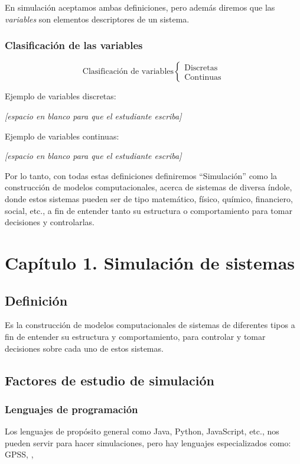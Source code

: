 \documentclass[11pt,letterpaper]{report}
\newcommand{\espacio}{\par\noindent\textit{[espacio en blanco para que el estudiante escriba]}\par}
\begin{document}
En simulación aceptamos ambas definiciones, pero además diremos que las \emph{variables} son elementos descriptores de un sistema.

\subsubsection*{Clasificación de las variables}

\[
\text{Clasificación de variables}
\begin{cases}
\text{Discretas}\\
\text{Continuas}
\end{cases}
\]

Ejemplo de variables discretas:
\espacio

Ejemplo de variables continuas:
\espacio

Por lo tanto, con todas estas definiciones definiremos ``Simulación'' como la construcción de modelos computacionales, acerca de sistemas de diversa índole, donde estos sistemas pueden ser de tipo matemático, físico, químico, financiero, social, etc., a fin de entender tanto su estructura o comportamiento para tomar decisiones y controlarlas.

\section*{Capítulo 1. Simulación de sistemas}

\subsection*{Definición}

Es la construcción de modelos computacionales de sistemas de diferentes tipos a fin de entender su estructura y comportamiento, para controlar y tomar decisiones sobre cada uno de estos sistemas.

\subsection*{Factores de estudio de simulación}

\subsubsection*{Lenguajes de programación}

Los lenguajes de propósito general como Java, Python, JavaScript, etc., nos pueden servir para hacer simulaciones, pero hay lenguajes especializados como: GPSS, \underline{\hspace{2.5cm}}, \underline{\hspace{2.5cm}}
\end{document}
